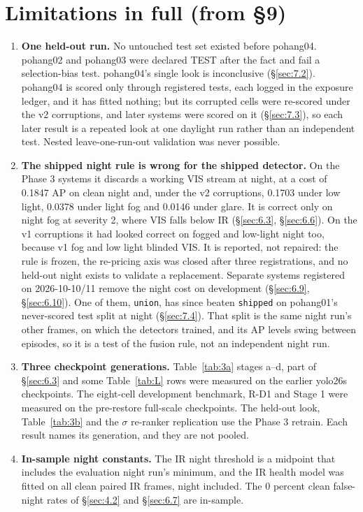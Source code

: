 \documentclass[10pt]{article}
\begin{document}
\section{Limitations in full (from \S9)}\label{app:L}
\begin{enumerate}
\item \textbf{One held-out run.} No untouched test set existed before pohang04. pohang02 and pohang03 were declared TEST after the fact and fail a selection-bias test. pohang04's single look is inconclusive (\S\ref{sec:7.2}). pohang04 is scored only through registered tests, each logged in the exposure ledger, and it has fitted nothing; but its corrupted cells were re-scored under the v2 corruptions, and later systems were scored on it (\S\ref{sec:7.3}), so each later result is a repeated look at one daylight run rather than an independent test. Nested leave-one-run-out validation was never possible.
\item \textbf{The shipped night rule is wrong for the shipped detector.} On the Phase 3 systems it discards a working VIS stream at night, at a cost of 0.1847 AP on clean night and, under the v2 corruptions, 0.1703 under low light, 0.0378 under light fog and 0.0146 under glare. It is correct only on night fog at severity 2, where VIS falls below IR (\S\ref{sec:6.3}, \S\ref{sec:6.6}). On the v1 corruptions it had looked correct on fogged and low-light night too, because v1 fog and low light blinded VIS. It is reported, not repaired: the rule is frozen, the re-pricing axis was closed after three registrations, and no held-out night exists to validate a replacement. Separate systems registered on 2026-10-10/11 remove the night cost on development (\S\ref{sec:6.9}, \S\ref{sec:6.10}). One of them, \texttt{union}, has since beaten \texttt{shipped} on pohang01's never-scored test split at night (\S\ref{sec:7.4}). That split is the same night run's other frames, on which the detectors trained, and its AP levels swing between episodes, so it is a test of the fusion rule, not an independent night run.
\item \textbf{Three checkpoint generations.} Table~\ref{tab:3a} stages a--d, part of \S\ref{sec:6.3} and some Table~\ref{tab:L} rows were measured on the earlier yolo26s checkpoints. The eight-cell development benchmark, R-D1 and Stage 1 were measured on the pre-restore full-scale checkpoints. The held-out look, Table~\ref{tab:3b} and the $\sigma$ re-ranker replication use the Phase 3 retrain. Each result names its generation, and they are not pooled.
\item \textbf{In-sample night constants.} The IR night threshold is a midpoint that includes the evaluation night run's minimum, and the IR health model was fitted on all clean paired IR frames, night included. The 0 percent clean false-night rates of \S\ref{sec:4.2} and \S\ref{sec:6.7} are in-sample.

\end{enumerate}
\end{document}
